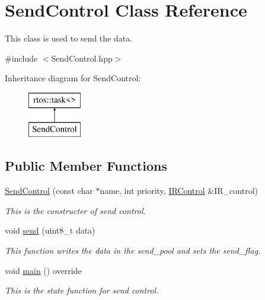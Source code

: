 \hypertarget{class_send_control}{}\section{Send\+Control Class Reference}
\label{class_send_control}


This class is used to send the data.  




{\ttfamily \#include $<$Send\+Control.\+hpp$>$}

Inheritance diagram for Send\+Control\+:\begin{figure}[H]
\begin{center}
\leavevmode
\includegraphics[height=2.000000cm]{class_send_control}
\end{center}
\end{figure}
\subsection*{Public Member Functions}
\begin{DoxyCompactItemize}
\item 
\mbox{\hyperlink{class_send_control_af666c41a0c262bf86bbb3009003b2c81}{Send\+Control}} (const char $\ast$name, int priority, \mbox{\hyperlink{class_i_r_control}{I\+R\+Control}} \&I\+R\+\_\+control)
\begin{DoxyCompactList}\small\item\em This is the constructer of send control. \end{DoxyCompactList}\item 
\mbox{\label{class_send_control_a631b78165c258e5ee4bde7d0790385a0}} 
void \mbox{\hyperlink{class_send_control_a631b78165c258e5ee4bde7d0790385a0}{send}} (uint8\+\_\+t data)
\begin{DoxyCompactList}\small\item\em This function writes the data in the send\+\_\+pool and sets the send\+\_\+flag. \end{DoxyCompactList}\item 
void \mbox{\hyperlink{class_send_control_aedec285713d090002e2848228cef2617}{main}} () override
\begin{DoxyCompactList}\small\item\em This is the state function for send control. \end{DoxyCompactList}\end{DoxyCompactItemize}


